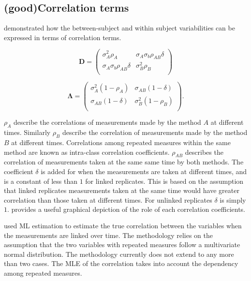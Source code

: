 \documentclass[12pt, a4paper]{report}
\theoremstyle{plain}
\theoremstyle{definition}
\theoremstyle{remark}
\begin{document}

		\subsection{ (good)Correlation terms}

	\citet{hamlett} demonstrated how the between-subject and within subject variabilities can be expressed in terms of
	correlation terms.
	
	\[
	\boldsymbol{D} = \left( \begin{array}{cc}
	\sigma^2_{A}\rho_{A} & \sigma_{A}\sigma_{b}\rho_{AB}\delta \\
	\sigma_{A}\sigma_{b}\rho_{AB}\delta & \sigma^2_{B}\rho_{B}\\
	
	\end{array}\right)
	\]
	
	\[
	\boldsymbol{\Lambda} = \left(
	\begin{array}{cc}
	\sigma^2_{A}(1-\rho_{A}) & \sigma_{AB}(1-\delta)  \\
	\sigma_{AB}(1-\delta) & \sigma^2_{B}(1-\rho_{B}) \\
	\end{array}\right).
	\]
	
	$\rho_{A}$ describe the correlations of measurements made by the method $A$ at different times. Similarly $\rho_{B}$ describe the correlation of measurements made by the method $B$ at different times. Correlations among repeated measures within the same method are known as intra-class correlation coefficients. $\rho_{AB}$ describes the correlation of measurements taken at the same same time by both methods. The coefficient $\delta$ is added for when the measurements are taken at different times, and is a constant of less than $1$ for linked replicates. This is based on the assumption that linked replicates measurements taken at the same time would have greater correlation than those taken at different times. For unlinked replicates $\delta$ is simply $1$. \citet{hamlett} provides a useful graphical depiction of the role of each correlation coefficients.
	
	\citet{lam} used ML estimation to estimate the true correlation between the variables when the measurements are linked over time. The methodology relies on the assumption that the two variables with repeated measures follow a multivariate normal distribution. The methodology currently does not extend to any more than two cases. The MLE of the correlation takes into account the dependency among repeated measures.
	
\end{document}
